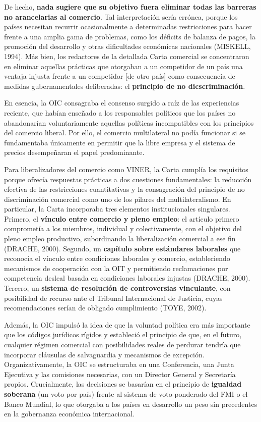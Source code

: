\documentclass[10pt,a4paper]{article}
\begin{document}
De hecho, \textbf{nada sugiere que su objetivo fuera eliminar todas las barreras no arancelarias al comercio}. Tal interpretación sería errónea, porque los países necesitan recurrir ocasionalmente a determinadas restricciones para hacer frente a una amplia gama de problemas, como los déficits de balanza de pagos, la promoción del desarrollo y otras dificultades económicas nacionales (MISKELL, 1994). Más bien, los redactores de la detallada Carta comercial se concentraron en eliminar aquellas prácticas que otorgaban a un competidor de un país una ventaja injusta frente a un competidor [de otro país] como consecuencia de medidas gubernamentales deliberadas: el \textbf{principio de no dicscriminación}.

En esencia, la OIC consagraba el consenso surgido a raíz de las experiencias reciente, que habían enseñado a los responsables políticos que los países no abandonarían voluntariamente aquellas políticas incompatibles con los principios del comercio liberal. Por ello, el comercio multilateral no podía funcionar si se fundamentaba únicamente en permitir que la libre empresa y el sistema de precios desempeñaran el papel predominante. 

Para liberalizadores del comercio como VINER, la Carta cumplía los requisitos porque ofrecía respuestas prácticas a dos cuestiones fundamentales: la reducción efectiva de las restricciones cuantitativas y la consagración del principio de no discriminación comercial como uno de los pilares del multilateralismo. En particular, la Carta incorporaba tres elementos institucionales singulares. Primero, el \textbf{vínculo entre comercio y pleno empleo}: el artículo primero  comprometía a los miembros, individual y colectivamente, con el objetivo del  pleno empleo productivo, subordinando la liberalización comercial a ese fin (DRACHE, 2000). Segundo, un \textbf{capítulo sobre estándares laborales} que reconocía el vínculo entre condiciones laborales y comercio, estableciendo mecanismos de cooperación con la OIT y permitiendo reclamaciones por competencia desleal basada en condiciones laborales injustas (DRACHE, 2000).  Tercero, un \textbf{sistema de resolución de controversias vinculante}, con  posibilidad de recurso ante el Tribunal Internacional de Justicia, cuyas recomendaciones serían de obligado cumplimiento (TOYE, 2002).

Además, la OIC impulsó la idea de que la voluntad política era más importante que los códigos jurídicos rígidos y estableció el principio de que, en el futuro, cualquier régimen comercial con posibilidades reales de perdurar tendría que incorporar cláusulas de salvaguardia y mecanismos de excepción. Organizativamente, la OIC se estructuraba en una Conferencia, una Junta Ejecutiva  y las comisiones necesarias, con un Director General y Secretaría propios.  Crucialmente, las decisiones se basarían en el principio de \textbf{igualdad soberana} (un voto por país) frente al sistema de voto ponderado del FMI o el Banco Mundial, lo que otorgaba a los países en desarrollo un peso sin precedentes en la gobernanza económica internacional.
\end{document}
